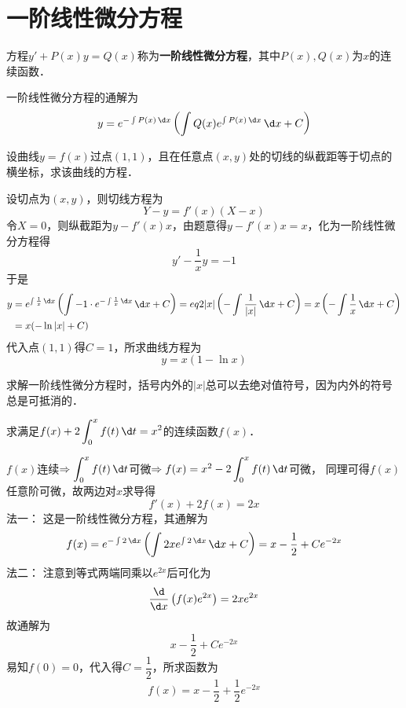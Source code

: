 \documentclass[12pt, a4paper, oneside, UTF8]{ctexbook}
\begin{document}
\section{一阶线性微分方程}
\begin{definition}
    方程$y'+P(x)y=Q(x)$称为\textbf{一阶线性微分方程}，其中$P(x),Q(x)$为$x$的连续函数．
\end{definition}
\begin{theorem}
    一阶线性微分方程的通解为
    \[
    y=e^{-\int P(x)\,\d x}\left(\int Q(x)e^{\int P(x)\,\d x}\,\d x+C\right)
    \]
\end{theorem}
\begin{example}
    设曲线$y=f(x)$过点$(1,1)$，且在任意点$(x,y)$处的切线的纵截距等于切点的横坐标，求该曲线的方程．
\end{example}
\begin{solution}
    设切点为$(x,y)$，则切线方程为
    \[Y-y=f'(x)(X-x)\]
    令$X=0$，则纵截距为$y-f'(x)x$，由题意得$y-f'(x)x=x$，化为一阶线性微分方程得
    \[y'-\dfrac{1}{x}y=-1\]
    于是
    \begin{align*}
        y&=e^{\int \frac{1}{x}\,\d x}\left(\int -1\cdot e^{-\int \frac{1}{x}\,\d x}\,\d x+C\right)
        ={eq2}|x|\left(-\int \frac{1}{|x|}\,\d x+C\right)
        =x\left(-\int \frac{1}{x}\,\d x+C\right)\\
        &=x(-\ln|x|+C)
    \end{align*}
    代入点$(1,1)$得$C=1$，所求曲线方程为
    \[\boxed{y=x(1-\ln x)}\]
\end{solution}
\begin{myRemark}
    求解一阶线性微分方程时，括号内外的$|x|$总可以去绝对值符号，因为内外的符号总是可抵消的．
\end{myRemark}
\begin{example}
    求满足$f(x)+2\displaystyle\int_{0}^{x}f(t)\,\d t=x^2$的连续函数$f(x)$．
\end{example}
\begin{solution}
    $f(x)$连续$\Rightarrow\displaystyle\int_{0}^{x}f(t)\,\d t$可微$\Rightarrow f(x)=x^2-2\displaystyle\int_{0}^{x}f(t)\,\d t$可微，
    同理可得$f(x)$任意阶可微，故两边对$x$求导得
    \[f'(x)+2f(x)=2x\]
    法一：
    这是一阶线性微分方程，其通解为
    \[f(x)=e^{-\int 2\,\d x}\left(\int 2xe^{\int 2\,\d x}\,\d x+C\right)=x-\dfrac{1}{2}+Ce^{-2x}\]
    法二：
    注意到等式两端同乘以$e^{2x}$后可化为
    \[\frac{\d}{\d x}\left(f(x)e^{2x}\right)=2xe^{2x}\]
    故通解为
    \[x-\dfrac{1}{2}+Ce^{-2x}\]
    易知$f(0)=0$，代入得$C=\dfrac{1}{2}$，所求函数为
    \[\boxed{f(x)=x-\dfrac{1}{2}+\dfrac{1}{2}e^{-2x}}\]
\end{solution}
\end{document}
